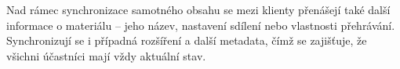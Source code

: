 Nad rámec synchronizace samotného obsahu se mezi klienty přenášejí také další informace o materiálu -- jeho název, nastavení sdílení nebo vlastnosti přehrávání.
Synchronizují se i případná rozšíření a další metadata, čímž se zajišťuje, že všichni účastníci mají vždy aktuální stav.






